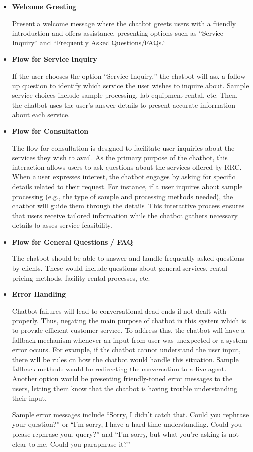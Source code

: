 \begin{itemize}
	\item \textbf{Welcome Greeting}
	
	Present a welcome message where the chatbot greets users with a friendly introduction and offers assistance, presenting options such as ``Service Inquiry'' and “Frequently Asked Questions/FAQs.” 
	
	\item \textbf{Flow for Service Inquiry}
	
	If the user chooses the option “Service Inquiry,” the chatbot will ask a follow-up question to identify which service the user wishes to inquire about. Sample service choices include sample processing,  lab equipment rental, etc. Then, the chatbot uses the user's answer details to present accurate information about each service.
	
	\item \textbf{Flow for Consultation}
	
	The flow for consultation is designed to facilitate user inquiries about the services they wish to avail. As the primary purpose of the chatbot, this interaction allows users to ask questions about the services offered by RRC. When a user expresses interest, the chatbot engages by asking for specific details related to their request. For instance, if a user inquires about sample processing (e.g., the type of sample and processing methods needed), the chatbot will guide them through the details. This interactive process ensures that users receive tailored information while the chatbot gathers necessary details to asses service feasibility.
	
	\item \textbf{Flow for General Questions / FAQ}
	
	The chatbot should be able to answer and handle frequently asked questions by clients. These would include questions about general services, rental pricing methods, facility rental processes, etc.
	
	\item \textbf{Error Handling}
	
	Chatbot failures will lead to conversational dead ends if not dealt with properly. Thus, negating the main purpose of chatbot in this system which is to provide efficient customer service. To address this, the chatbot will have a fallback mechanism whenever an input from user was unexpected or a system error occurs. For example, if the chatbot cannot understand the user input, there will be rules on how the chatbot would handle this situation. Sample fallback methods would be redirecting the conversation to a live agent. Another option would be presenting friendly-toned error messages to the users, letting them know that the chatbot is having trouble understanding their input.
	
	Sample error messages include “Sorry, I didn't catch that. Could you rephrase your question?” or “I'm sorry, I have a hard time understanding. Could you please rephrase your query?” and “I'm sorry, but what you're asking is not clear to me. Could you paraphrase it?”
	
\end{itemize}

